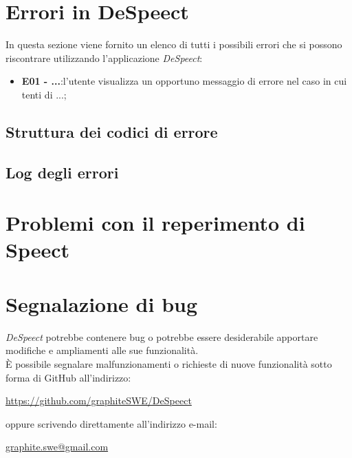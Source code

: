 \documentclass[openany,12pt,a4paper]{report}
\begin{document}
	\section{Errori in DeSpeect}
	
	In questa sezione viene fornito un elenco di tutti i possibili errori che si possono riscontrare utilizzando l’applicazione \textit{DeSpeect}:
	\begin{itemize}
		\item \textbf{E01 - ...}:l'utente visualizza un opportuno messaggio di errore nel caso in cui tenti di ...;
	\end{itemize}
	
	\subsection{Struttura dei codici di errore} 
	
	\subsection{Log degli errori}
	
	\section{Problemi con il reperimento di Speect}
	
	\section{Segnalazione di bug}
	
	\textit{DeSpeect} potrebbe contenere bug o potrebbe essere desiderabile apportare modifiche e ampliamenti alle sue funzionalità. \\ È possibile segnalare malfunzionamenti o richieste di nuove funzionalità sotto forma di GitHub  all’indirizzo:
	\begin{center}
		\url{https://github.com/graphiteSWE/DeSpeect}
	\end{center}
  oppure scrivendo direttamente all'indirizzo e-mail:
  \begin{center}
  	\url{graphite.swe@gmail.com}
  \end{center}
	
	\appendix
	
	\printglossary[style=glossaryStyle, nonumberlist]
	
\end{document}
